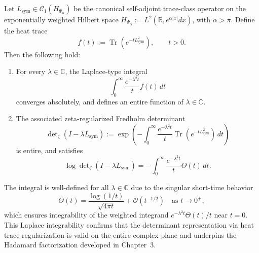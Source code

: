 \begin{lemma}
\label{lem:laplace_integrability_heat_trace}
Let \( L_{\mathrm{sym}} \in \mathcal{C}_1(H_{\Psi_\alpha}) \) be the canonical self-adjoint trace-class operator on the exponentially weighted Hilbert space \( H_{\Psi_\alpha} := L^2(\mathbb{R}, e^{\alpha|x|} dx) \), with \( \alpha > \pi \). Define the heat trace
\[
f(t) := \operatorname{Tr}\left(e^{-t L_{\mathrm{sym}}^2}\right), \qquad t > 0.
\]
Then the following hold:
\begin{enumerate}
    \item For every \( \lambda \in \mathbb{C} \), the Laplace-type integral
    \[
    \int_0^\infty \frac{e^{-\lambda^2 t}}{t} f(t)\, dt
    \]
    converges absolutely, and defines an entire function of \( \lambda \in \mathbb{C} \).
    
    \item The associated zeta-regularized Fredholm determinant
    \[
    \det\nolimits_{\zeta}(I - \lambda L_{\mathrm{sym}}) := \exp\left( -\int_0^\infty \frac{e^{-\lambda^2 t}}{t} \operatorname{Tr}\left(e^{-t L_{\mathrm{sym}}^2}\right) \, dt \right)
    \]
    is entire, and satisfies
    \[
    \log \det\nolimits_{\zeta}(I - \lambda L_{\mathrm{sym}}) = - \int_0^\infty \frac{e^{-\lambda^2 t}}{t} \Theta(t)\, dt.
    \]
\end{enumerate}
\noindent
The integral is well-defined for all \( \lambda \in \mathbb{C} \) due to the singular short-time behavior
\[
\Theta(t) = \frac{\log(1/t)}{\sqrt{4\pi t}} + \mathcal{O}(t^{-1/2}) \quad \text{as } t \to 0^+,
\]
which ensures integrability of the weighted integrand \( e^{-\lambda^2 t} \Theta(t)/t \) near \( t = 0 \). This Laplace integrability confirms that the determinant representation via heat trace regularization is valid on the entire complex plane and underpins the Hadamard factorization developed in Chapter~3.
\end{lemma}
